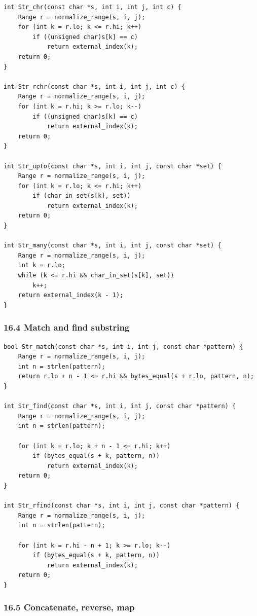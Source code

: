\documentclass[11pt]{article}
\begin{document}
\begin{verbatim}
int Str_chr(const char *s, int i, int j, int c) {
    Range r = normalize_range(s, i, j);
    for (int k = r.lo; k <= r.hi; k++)
        if ((unsigned char)s[k] == c)
            return external_index(k);
    return 0;
}

int Str_rchr(const char *s, int i, int j, int c) {
    Range r = normalize_range(s, i, j);
    for (int k = r.hi; k >= r.lo; k--)
        if ((unsigned char)s[k] == c)
            return external_index(k);
    return 0;
}

int Str_upto(const char *s, int i, int j, const char *set) {
    Range r = normalize_range(s, i, j);
    for (int k = r.lo; k <= r.hi; k++)
        if (char_in_set(s[k], set))
            return external_index(k);
    return 0;
}

int Str_many(const char *s, int i, int j, const char *set) {
    Range r = normalize_range(s, i, j);
    int k = r.lo;
    while (k <= r.hi && char_in_set(s[k], set))
        k++;
    return external_index(k - 1);
}
\end{verbatim}

\subsubsection{16.4 Match and find substring}\label{match-and-find-substring}

\begin{verbatim}
bool Str_match(const char *s, int i, int j, const char *pattern) {
    Range r = normalize_range(s, i, j);
    int n = strlen(pattern);
    return r.lo + n - 1 <= r.hi && bytes_equal(s + r.lo, pattern, n);
}

int Str_find(const char *s, int i, int j, const char *pattern) {
    Range r = normalize_range(s, i, j);
    int n = strlen(pattern);

    for (int k = r.lo; k + n - 1 <= r.hi; k++)
        if (bytes_equal(s + k, pattern, n))
            return external_index(k);
    return 0;
}

int Str_rfind(const char *s, int i, int j, const char *pattern) {
    Range r = normalize_range(s, i, j);
    int n = strlen(pattern);

    for (int k = r.hi - n + 1; k >= r.lo; k--)
        if (bytes_equal(s + k, pattern, n))
            return external_index(k);
    return 0;
}
\end{verbatim}

\subsubsection{16.5 Concatenate, reverse, map}\label{concatenate-reverse-map}
\end{document}

